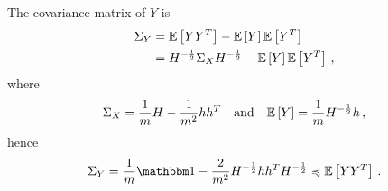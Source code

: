 The covariance matrix of $Y$ is
\begin{equation*}
\begin{aligned}
\Sigma_Y &= \mathbb E \left[ YY^T \right] - \mathbb E \left[ Y \right]\mathbb E \left[ Y^T \right] \\ &= H^{-\frac 1 2} \Sigma_X H^{-\frac 1 2} - \mathbb E \left[ Y \right]\mathbb E \left[ Y^T \right]\, ,
\end{aligned}
\end{equation*}
where
\begin{equation*}
    \Sigma_X = \frac{1}{m} H - \frac{1}{m^2}h h^T
    \quad \text{and} \quad
    \mathbb E \left[ Y \right] = \frac{1}{m}H^{-\frac 1 2}h \, ,
\end{equation*}
hence
\begin{equation*}
    \Sigma_Y = \frac 1 m \mathbbm 1 - \frac{2}{m^2} H^{-\frac 1 2} h h^T H^{-\frac 1 2} \preccurlyeq \esp{YY^T} \, .
\end{equation*}

